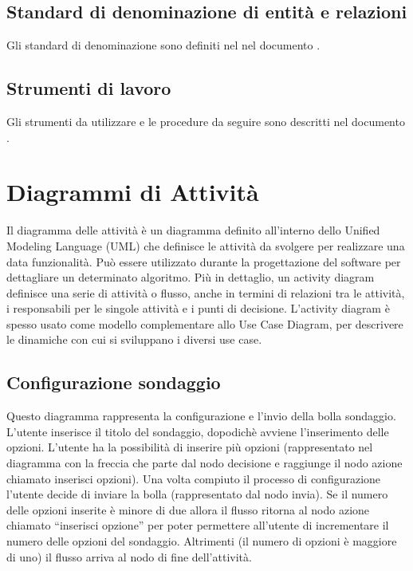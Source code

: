 \subsection{Standard di denominazione di entità e relazioni }
Gli standard di denominazione sono definiti nel nel
documento  \emph{\normediprogetto} .

\subsection{Strumenti di lavoro}
Gli strumenti da utilizzare e le procedure da seguire sono descritti
nel documento  \emph{\normediprogetto} .


\section{Diagrammi di Attività}
Il diagramma delle attività è un diagramma definito all'interno dello
Unified Modeling Language (UML) che definisce le attività da svolgere
per realizzare una data funzionalità. Può essere utilizzato durante la
progettazione del software per dettagliare un determinato
algoritmo. Più in dettaglio, un activity diagram definisce una serie
di attività o flusso, anche in termini di relazioni tra le attività, i
responsabili per le singole attività e i punti di
decisione. L'activity diagram è spesso usato come modello
complementare allo Use Case Diagram, per descrivere le dinamiche con
cui si sviluppano i diversi use case. 

\subsection{Configurazione sondaggio}
Questo diagramma rappresenta la configurazione e l'invio della bolla
sondaggio. L’utente inserisce il titolo del sondaggio, dopodichè
avviene l’inserimento delle opzioni. L’utente ha la possibilità di
inserire più opzioni (rappresentato nel diagramma con la freccia che
parte dal nodo decisione e raggiunge il nodo azione chiamato inserisci
opzioni). Una volta compiuto il processo di configurazione l’utente
decide di inviare la bolla (rappresentato dal nodo invia). Se il
numero delle opzioni inserite è minore di due allora il flusso ritorna
al nodo azione chiamato “inserisci opzione” per poter permettere
all’utente di incrementare il numero delle opzioni del
sondaggio. Altrimenti (il numero di opzioni è maggiore di uno) il
flusso arriva al nodo di fine dell’attività. 

